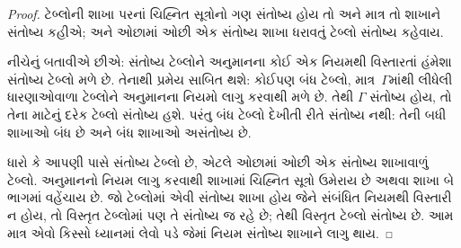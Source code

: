 \begin{proof}
ટેબ્લોની શાખા પરનાં ચિહ્નિત સૂત્રોનો ગણ સંતોષ્ય હોય
તો અને માત્ર તો શાખાને સંતોષ્ય કહીએ; અને ઓછામાં ઓછી એક સંતોષ્ય
શાખા ધરાવતું ટેબ્લો સંતોષ્ય કહેવાય.

નીચેનું બતાવીએ છીએ: સંતોષ્ય ટેબ્લોને અનુમાનના કોઈ એક નિયમથી
વિસ્તારતાં હંમેશા સંતોષ્ય ટેબ્લો મળે છે. તેનાથી પ્રમેય
સાબિત થશે: કોઈપણ બંધ ટેબ્લો, માત્ર~$\Gamma$માંથી લીધેલી
ધારણાઓવાળા ટેબ્લોને અનુમાનના નિયમો લાગુ કરવાથી મળે છે.
તેથી $\Gamma$ સંતોષ્ય હોય, તો તેના માટેનું દરેક ટેબ્લો
સંતોષ્ય હશે. પરંતુ બંધ ટેબ્લો દેખીતી રીતે સંતોષ્ય નથી:
તેની બધી શાખાઓ બંધ છે અને બંધ શાખાઓ અસંતોષ્ય છે.

ધારો કે આપણી પાસે સંતોષ્ય ટેબ્લો છે, એટલે ઓછામાં ઓછી એક
સંતોષ્ય શાખાવાળું ટેબ્લો. અનુમાનનો નિયમ લાગુ કરવાથી
શાખામાં ચિહ્નિત સૂત્રો ઉમેરાય છે અથવા શાખા બે ભાગમાં
વહેંચાય છે. જો ટેબ્લોમાં એવી સંતોષ્ય શાખા હોય જેને સંબંધિત
નિયમથી વિસ્તારી ન હોય, તો વિસ્તૃત ટેબ્લોમાં પણ તે
સંતોષ્ય જ રહે છે; તેથી વિસ્તૃત ટેબ્લો સંતોષ્ય છે. આમ માત્ર એવો
કિસ્સો ધ્યાનમાં લેવો પડે જેમાં નિયમ સંતોષ્ય શાખાને લાગુ થાય.


\end{proof}
